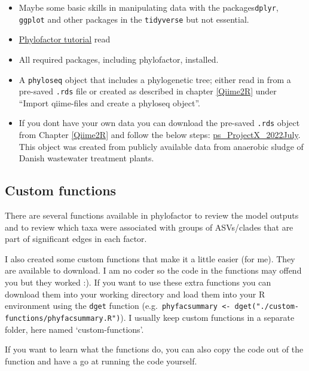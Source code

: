\documentclass[
]{book}
\providecommand{\tightlist}{%
  \setlength{\itemsep}{0pt}\setlength{\parskip}{0pt}}
\begin{document}
\begin{itemize}
\tightlist
\item
  Maybe some basic skills in manipulating data with the packages\texttt{dplyr}, \texttt{ggplot} and other packages in the \texttt{tidyverse} but not essential.\\
\item
  \href{https://docs.wixstatic.com/ugd/0119a1_099ae20df8424af9a38585dcebc0d45a.pdf}{Phylofactor tutorial} read\\
\item
  All required packages, including phylofactor, installed.\\
\item
  A \texttt{phyloseq} object that includes a phylogenetic tree; either read in from a pre-saved \texttt{.rds} file or created as described in chapter \ref{Qiime2R} under ``Import qiime-files and create a phyloseq object''.\\
\item
  If you dont have your own data you can download the pre-saved \texttt{.rds} object from Chapter \ref{Qiime2R} and follow the below steps: \href{./ps_ProjectX_2022July}{ps\_ProjectX\_2022July}. This object was created from publicly available data from anaerobic sludge of Danish wastewater treatment plants.
\end{itemize}

\hypertarget{custom-functions}{%
\subsection{Custom functions}\label{custom-functions}}

There are several functions available in phylofactor to review the model outputs and to review which taxa were associated with groups of ASVs/clades that are part of significant edges in each factor.

I also created some custom functions that make it a little easier (for me). They are available to download. I am no coder so the code in the functions may offend you but they worked :). If you want to use these extra functions you can download them into your working directory and load them into your R environment using the \texttt{dget} function (e.g.~\texttt{phyfacsummary\ \textless{}-\ dget("./custom-functions/phyfacsummary.R")}). I usually keep custom functions in a separate folder, here named `custom-functions'.

If you want to learn what the functions do, you can also copy the code out of the function and have a go at running the code yourself.
\end{document}

